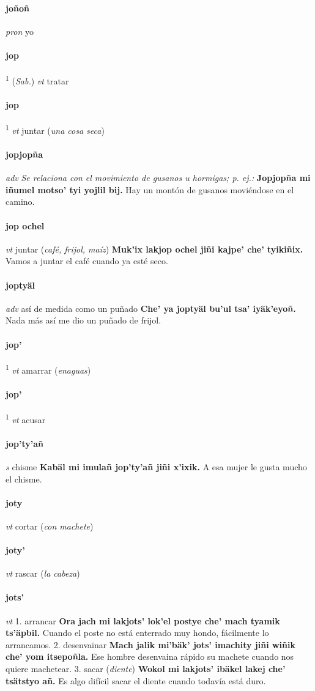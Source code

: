 \documentclass{scrbook}
\newcommand{\entry}[1]{\paragraph{#1}}
\newcommand{\onedefinition}[1]{#1.}
\newcommand{\defsuperscript}[1]{\textsuperscript{1}}
\newcommand{\nontranslationdef}[1]{\textit{#1}}
\newcommand{\partofspeech}[1]{\textit{#1}}
\newcommand{\spanishtranslation}[1]{#1}
\newcommand{\clarification}[1]{(\textit{#1})}
\newcommand{\cholexample}[1]{\textbf{#1}}
\newcommand{\exampletranslation}[1]{#1}
\newcommand{\relevantdialect}[1]{(\textit{#1})}
\begin{document}
\begin{multicols}{2}
\entry{joñoñ}
\partofspeech{pron}
\spanishtranslation{yo}

\entry{jop}
\defsuperscript{1}
\relevantdialect{Sab.}
\partofspeech{vt}
\spanishtranslation{tratar}

\entry{jop}
\defsuperscript{2}
\partofspeech{vt}
\spanishtranslation{juntar}
\clarification{una cosa seca}

\entry{jopjopña}
\partofspeech{adv}
\nontranslationdef{Se relaciona con el movimiento de gusanos u hormigas; p. ej.:}
\cholexample{Jopjopña mi iñumel motso' tyi yojlil bij.}
\exampletranslation{Hay un montón de gusanos moviéndose en el camino.}

\entry{jop ochel}
\partofspeech{vt}
\spanishtranslation{juntar}
\clarification{café, frijol, maíz}
\cholexample{Muk'ix lakjop ochel jiñi kajpe' che' tyikiñix.}
\exampletranslation{Vamos a juntar el café cuando ya esté seco.}

\entry{joptyäl}
\partofspeech{adv}
\spanishtranslation{así de medida como un puñado}
\cholexample{Che' ya joptyäl bu'ul tsa' iyäk'eyoñ.}
\exampletranslation{Nada más así me dio un puñado de frijol.}

\entry{jop'}
\defsuperscript{1}
\partofspeech{vt}
\spanishtranslation{amarrar}
\clarification{enaguas}

\entry{jop'}
\defsuperscript{2}
\partofspeech{vt}
\spanishtranslation{acusar}

\entry{jop'ty'añ}
\partofspeech{s}
\spanishtranslation{chisme}
\cholexample{Kabäl mi imulañ jop'ty'añ jiñi x'ixik.}
\exampletranslation{A esa mujer le gusta mucho el chisme.}

\entry{joty}
\partofspeech{vt}
\spanishtranslation{cortar}
\clarification{con machete}

\entry{joty'}
\partofspeech{vt}
\spanishtranslation{rascar}
\clarification{la cabeza}

\entry{jots'}
\partofspeech{vt}
\onedefinition{1}
\spanishtranslation{arrancar}
\cholexample{Ora jach mi lakjots' lok'el postye che' mach tyamik ts'äpbil.}
\exampletranslation{Cuando el poste no está enterrado muy hondo, fácilmente lo arrancamos.}
\onedefinition{2}
\spanishtranslation{desenvainar}
\cholexample{Mach jalik mi'bäk' jots' imachity jiñi wiñik che' yom itsepoñla.}
\exampletranslation{Ese hombre desenvaina rápido su machete cuando nos quiere machetear.}
\onedefinition{3}
\spanishtranslation{sacar}
\clarification{diente}
\cholexample{Wokol mi lakjots' ibäkel lakej che' tsätstyo añ.}
\exampletranslation{Es algo difícil sacar el diente cuando todavía está duro.}


\end{multicols}
\end{document}
